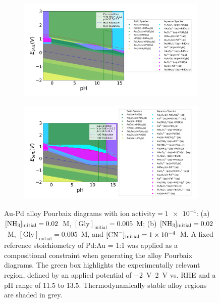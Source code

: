 \documentclass[journal=jacsat,manuscript=article]{achemso}
\begin{document}
\begin{figure}[htbp]
    \centering
    \begin{subfigure}[b]{0.45\textwidth}
        \subcaption{}\label{fig:PdAu_Pourbaix_NH3_Gly}
        \includegraphics[width=\textwidth]
        {Figures/alloy_pourbaix_diagrams/Pd_Au_alloy_Pd0.5 Au0.5_NH3=0.02M_Gly=0.005M_CN=0M_activity=1e-04M.png}
    \end{subfigure}
    \begin{subfigure}[b]{0.45\textwidth}
        \subcaption{}\label{fig:PdAu_Pourbaix_NH3_Gly_CN}
        \includegraphics[width=\textwidth]{Figures/alloy_pourbaix_diagrams/Pd_Au_alloy_Pd0.5 Au0.5_NH3=0.02M_Gly=0.005M_CN=0.0001M_activity=1e-04M.png}
    \end{subfigure}
    \caption{Au-Pd alloy Pourbaix diagrams with $\text{ion activity} = \num{1e-4}$: (a) $[\ce{NH3}]_\text{initial} = 0.02$~M, $[\text{Gly}]_\text{initial} = 0.005$~M; (b) $[\ce{NH3}]_\text{initial} = 0.02$~M, $[\text{Gly}]_\text{initial} = 0.005$~M, and $[\ce{CN^-}]_\text{initial} = \num{1e-4}$~M. A fixed reference stoichiometry of Pd:Au = 1:1 was applied as a compositional constraint when generating the alloy Pourbaix diagrams. The green box highlights the experimentally relevant region, defined by an applied potential of \SIrange{-2}{2}{V} vs. RHE and a pH range of 11.5 to 13.5. Thermodynamically stable alloy regions are shaded in grey.}
    \label{fig:PdAu_alloy_Pourbaix}
\end{figure}
\end{document}
